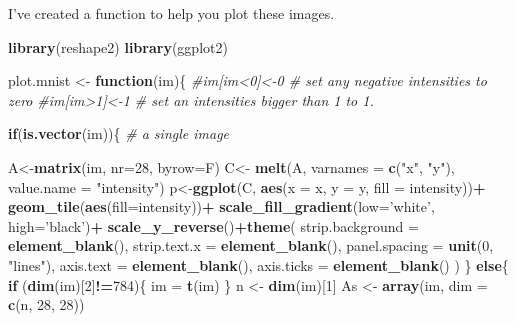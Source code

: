 \documentclass[]{book}
\newenvironment{Shaded}{\begin{snugshade}}{\end{snugshade}}
\newcommand{\CommentTok}[1]{\textcolor[rgb]{0.56,0.35,0.01}{\textit{#1}}}
\newcommand{\ControlFlowTok}[1]{\textcolor[rgb]{0.13,0.29,0.53}{\textbf{#1}}}
\newcommand{\DataTypeTok}[1]{\textcolor[rgb]{0.13,0.29,0.53}{#1}}
\newcommand{\DecValTok}[1]{\textcolor[rgb]{0.00,0.00,0.81}{#1}}
\newcommand{\KeywordTok}[1]{\textcolor[rgb]{0.13,0.29,0.53}{\textbf{#1}}}
\newcommand{\NormalTok}[1]{#1}
\newcommand{\OperatorTok}[1]{\textcolor[rgb]{0.81,0.36,0.00}{\textbf{#1}}}
\newcommand{\StringTok}[1]{\textcolor[rgb]{0.31,0.60,0.02}{#1}}
\theoremstyle{definition}
\theoremstyle{definition}
\theoremstyle{definition}
\theoremstyle{remark}
\begin{document}
\begin{Shaded}
\end{Shaded}

I've created a function to help you plot these images.

\begin{Shaded}
\begin{Highlighting}[]
\KeywordTok{library}\NormalTok{(reshape2)}
\KeywordTok{library}\NormalTok{(ggplot2)}


\NormalTok{plot.mnist <-}\StringTok{ }\ControlFlowTok{function}\NormalTok{(im)\{}
  \CommentTok{#im[im<0]<-0 # set any negative intensities to zero}
  \CommentTok{#im[im>1]<-1 # set an intensities bigger than 1 to 1.}
  
  
  \ControlFlowTok{if}\NormalTok{(}\KeywordTok{is.vector}\NormalTok{(im))\{ }\CommentTok{# a single image}
    
\NormalTok{    A<-}\KeywordTok{matrix}\NormalTok{(im, }\DataTypeTok{nr=}\DecValTok{28}\NormalTok{, }\DataTypeTok{byrow=}\NormalTok{F)}
\NormalTok{    C<-}\StringTok{ }\KeywordTok{melt}\NormalTok{(A, }\DataTypeTok{varnames =} \KeywordTok{c}\NormalTok{(}\StringTok{"x"}\NormalTok{, }\StringTok{"y"}\NormalTok{), }\DataTypeTok{value.name =} \StringTok{"intensity"}\NormalTok{)}
\NormalTok{    p<-}\KeywordTok{ggplot}\NormalTok{(C, }\KeywordTok{aes}\NormalTok{(}\DataTypeTok{x =}\NormalTok{ x, }\DataTypeTok{y =}\NormalTok{ y, }\DataTypeTok{fill =}\NormalTok{ intensity))}\OperatorTok{+}
\StringTok{      }\KeywordTok{geom_tile}\NormalTok{(}\KeywordTok{aes}\NormalTok{(}\DataTypeTok{fill=}\NormalTok{intensity))}\OperatorTok{+}
\StringTok{      }\KeywordTok{scale_fill_gradient}\NormalTok{(}\DataTypeTok{low=}\StringTok{'white'}\NormalTok{, }\DataTypeTok{high=}\StringTok{'black'}\NormalTok{)}\OperatorTok{+}
\StringTok{      }\KeywordTok{scale_y_reverse}\NormalTok{()}\OperatorTok{+}\KeywordTok{theme}\NormalTok{(}
        \DataTypeTok{strip.background =} \KeywordTok{element_blank}\NormalTok{(),}
        \DataTypeTok{strip.text.x =} \KeywordTok{element_blank}\NormalTok{(),}
        \DataTypeTok{panel.spacing =} \KeywordTok{unit}\NormalTok{(}\DecValTok{0}\NormalTok{, }\StringTok{"lines"}\NormalTok{),}
        \DataTypeTok{axis.text =} \KeywordTok{element_blank}\NormalTok{(),}
        \DataTypeTok{axis.ticks =} \KeywordTok{element_blank}\NormalTok{()}
\NormalTok{      ) }
\NormalTok{  \}}
  \ControlFlowTok{else}\NormalTok{\{}
    \ControlFlowTok{if}\NormalTok{ (}\KeywordTok{dim}\NormalTok{(im)[}\DecValTok{2}\NormalTok{]}\OperatorTok{!=}\DecValTok{784}\NormalTok{)\{}
\NormalTok{      im =}\StringTok{ }\KeywordTok{t}\NormalTok{(im)}
\NormalTok{    \} }
\NormalTok{    n <-}\StringTok{ }\KeywordTok{dim}\NormalTok{(im)[}\DecValTok{1}\NormalTok{]}
\NormalTok{    As <-}\StringTok{ }\KeywordTok{array}\NormalTok{(im, }\DataTypeTok{dim =} \KeywordTok{c}\NormalTok{(n, }\DecValTok{28}\NormalTok{, }\DecValTok{28}\NormalTok{))}
    

\end{Highlighting}
\end{Shaded}
\end{document}
